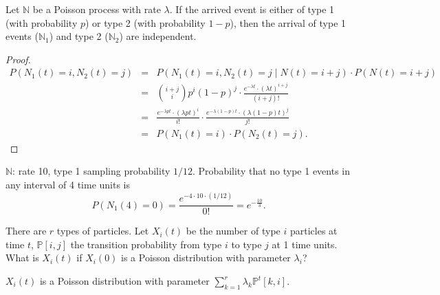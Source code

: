 \begin{properity}
Let $ \mathbb{N} $ be a Poisson process with rate $ \lambda $. If the arrived event is either of type 1 (with probability $ p $) or type 2 (with probability $ 1 - p $), then the arrival of type 1 events ($ \mathbb{N}_{1} $) and type 2 ($ \mathbb{N}_{2} $) are independent.
\begin{proof}
\begin{eqnarray*}
P(N_{1}(t) = i, N_{2}(t) = j)
  & = & P(N_{1}(t) = i, N_{2}(t) = j \mid N(t) = i + j) \cdot P(N(t) = i + j) \\
  & = & {{i + j}\choose{i}} p^{i} (1 - p)^{j} \cdot \frac{e^{-\lambda t} \cdot (\lambda t)^{i + j}}{(i + j)!} \\
  & = & \frac{e^{-\lambda p t} \cdot (\lambda p t)^{i}}{i!} \cdot \frac{e^{-\lambda (1 - p) t} \cdot (\lambda (1 - p) t)^{j}}{j!} \\
  & = & P(N_{1}(t) = i) \cdot P(N_{2}(t) = j).
\end{eqnarray*}
\end{proof}
\end{properity}

\begin{example}
$ \mathbb{N} $: rate 10, type 1 sampling probability $ 1 / 12 $.
Probability that no type 1 events in any interval of 4 time units is
\[ P(N_{1}(4) = 0) = \frac{e^{-4 \cdot 10 \cdot (1 / 12)}}{0!} = e^{-\frac{10}{3}}. \]
\end{example}

\begin{example}
There are $ r $ types of particles. Let $ X_{i}(t) $ be the number of type $ i $ particles at time $ t $, $ \mathbb{P}[i, j] $ the transition probability from type $ i $ to type $ j $ at 1 time units. What is $ X_{i}(t) $ if $ X_{i}(0) $ is a Poisson distribution with parameter $ \lambda_{i} $?

$ X_{i}(t) $ is a Poisson distribution with parameter $ \sum_{k = 1}^{r} \lambda_{k}\mathbb{P}^{t}[k, i]. $
\begin{comment}
$ \lambda_{k}\mathbb{P}^{t}[k, i] $ 為時間 0 為 type $ k $，到時間 $ t $ 變成 type $ i $ 的個數（是一個 Poisson distribution）的參數。
\end{comment}
\end{example}

